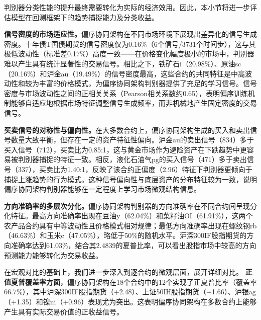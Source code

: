 判别器分类性能的提升最终需要转化为实际的经济效用。因此，本小节将进一步评估模型在回测框架下的趋势捕捉能力及分类收益。


\textbf{信号密度的市场适应性。}偏序协同架构在不同市场环境下展现出差异化的信号生成密度。十年债T国债期货的信号密度仅为0.16\%（6个信号/3731个时间步），这与其极低波动性（标准差0.17\%）高度一致——在价格变化幅度极小的市场中，判别器难以产生具有统计显著性的交易信号。相比之下，铁矿石i（20.98\%）、原油sc（20.16\%）和沪金au（19.49\%）的信号密度最高，这些合约的共同特征是中高波动性和较为丰富的价格模式，为偏序协同架构判别器提供了充足的学习信号。信号密度与市场波动性之间的正相关关系（Pearson相关系数约0.65），表明偏序训练机制能够自适应地根据市场特征调整信号生成频率，而非机械地产生固定密度的交易信号。

\textbf{买卖信号的对称性与偏向性。}在大多数合约上，偏序协同架构生成的买入和卖出信号数量大致平衡，但存在一定的资产特征性偏向。沪金au的卖出信号（834）多于买入信号（712），买卖比为0.85:1，这与黄金市场作为避险资产在下跌趋势中更容易被判别器捕捉的特征一致。相反，液化石油气pg的买入信号（471）多于卖出信号（337），买卖比为1.40:1，反映了该合约正偏度（2.96）特征下判别器更倾向于捕捉上涨趋势的行为模式。这种信号偏向性与底层资产的分布特征较为一致，说明偏序协同架构判别器能够在一定程度上学习市场微观结构信息。

\textbf{方向准确率的多层次分化。}偏序协同架构判别器的方向准确率在不同合约间呈现分化特征。最高方向准确率出现在豆油y（62.04\%）和菜籽油OI（61.91\%），这两个农产品合约具有中等波动性且价格模式相对规律；最低方向准确率出现在螺纹钢rb（46.63\%）和玉米c（47.05\%），略低于50\%的随机水平。沪深300IF股指期货的方向准确率达到61.03\%，结合其2.4839的夏普比率，可以看出股指市场中较高的方向预测能力能够转化为交易收益。






在宏观对比的基础上，我们进一步深入到逐合约的微观层面，展开详细对比。
\textbf{正值夏普覆盖率方面}，偏序协同架构在18个合约中的12个实现了正夏普比率（覆盖率66.7\%），其中沪深300IF股指期货（+2.48）、上证50IH股指期货（+1.66）、沪银ag（+1.35）和镍ni（+0.96）表现尤为突出。这表明偏序协同架构在多数合约上能够产生具有实际交易价值的正收益信号。

